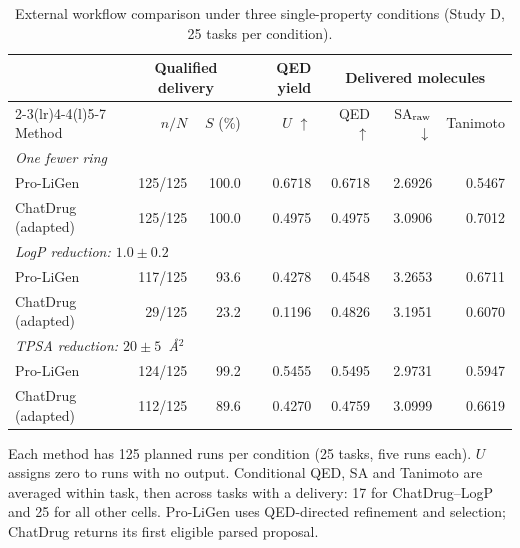 \begin{table}[!htbp]
\centering\small
\caption{External workflow comparison under three single-property conditions (Study D, 25 tasks per condition).}
\label{tab:external_comparison}
\setlength{\tabcolsep}{3pt}
\renewcommand{\arraystretch}{1.08}
\begin{tabular*}{\linewidth}{@{\extracolsep{\fill}}lrrrrrr@{}}
\toprule
 & \multicolumn{2}{c}{Qualified delivery} & QED yield & \multicolumn{3}{c}{Delivered molecules} \\
\cmidrule(lr){2-3}\cmidrule(lr){4-4}\cmidrule(l){5-7}
Method & $n/N$ & $S$ (\%) & $U$ $\uparrow$ & QED $\uparrow$ & SA$_{\rm raw}$ $\downarrow$ & Tanimoto \\
\midrule
\multicolumn{7}{l}{\textit{One fewer ring}} \\
Pro-LiGen & 125/125 & 100.0 & 0.6718 & 0.6718 & 2.6926 & 0.5467 \\
ChatDrug (adapted) & 125/125 & 100.0 & 0.4975 & 0.4975 & 3.0906 & 0.7012 \\
\midrule
\multicolumn{7}{l}{\textit{LogP reduction: $1.0\pm0.2$}} \\
Pro-LiGen & 117/125 & 93.6 & 0.4278 & 0.4548 & 3.2653 & 0.6711 \\
ChatDrug (adapted) & 29/125 & 23.2 & 0.1196 & 0.4826 & 3.1951 & 0.6070 \\
\midrule
\multicolumn{7}{l}{\textit{TPSA reduction: $20\pm5$~\AA$^2$}} \\
Pro-LiGen & 124/125 & 99.2 & 0.5455 & 0.5495 & 2.9731 & 0.5947 \\
ChatDrug (adapted) & 112/125 & 89.6 & 0.4270 & 0.4759 & 3.0999 & 0.6619 \\
\bottomrule
\end{tabular*}
\par\smallskip
\begin{minipage}{\linewidth}\footnotesize
Each method has 125 planned runs per condition (25 tasks, five runs each). $U$ assigns zero to runs with no output. Conditional QED, SA and Tanimoto are averaged within task, then across tasks with a delivery: 17 for ChatDrug--LogP and 25 for all other cells. Pro-LiGen uses QED-directed refinement and selection; ChatDrug returns its first eligible parsed proposal.
\end{minipage}
\end{table}
